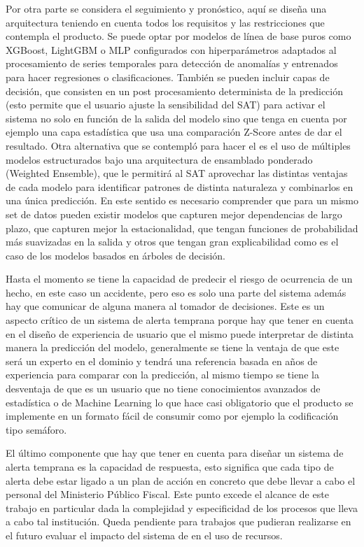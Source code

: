 Por otra parte se considera el seguimiento y pronóstico, aquí se diseña una arquitectura teniendo en cuenta todos los requisitos y las restricciones que contempla el producto. Se puede optar por modelos de línea de base puros como XGBoost, LightGBM o MLP configurados con hiperparámetros adaptados al procesamiento de series temporales para detección de anomalías y entrenados para hacer regresiones o clasificaciones. También se pueden incluir capas de decisión, que consisten en un post procesamiento determinista de la predicción (esto permite que el usuario ajuste la sensibilidad del SAT) para activar el sistema no solo en función de la salida del modelo sino que tenga en cuenta por ejemplo una capa estadística que usa una comparación Z-Score antes de dar el resultado. Otra alternativa que se contempló para hacer el  es el uso de múltiples modelos estructurados bajo una arquitectura de ensamblado ponderado (Weighted Ensemble), que le permitirá al SAT aprovechar las distintas ventajas de cada modelo para identificar patrones de distinta naturaleza y combinarlos en una única predicción. En este sentido es necesario comprender que para un mismo set de datos pueden existir modelos que capturen mejor dependencias de largo plazo, que capturen mejor la estacionalidad, que tengan funciones de probabilidad más suavizadas en la salida y otros que tengan gran explicabilidad como es el caso de los modelos basados en árboles de decisión.

Hasta el momento se tiene la capacidad de predecir el riesgo de ocurrencia de un hecho, en este caso un accidente, pero eso es solo una parte del sistema además hay que comunicar de alguna manera al tomador de decisiones. Este es un aspecto crítico de un sistema de alerta temprana porque hay que tener en cuenta en el diseño de experiencia de usuario que el mismo puede interpretar de distinta manera la predicción del modelo, generalmente se tiene la ventaja de que este será un experto en el dominio y tendrá una referencia basada en años de experiencia para comparar con la predicción, al mismo tiempo se tiene la desventaja de que es un usuario que no tiene conocimientos avanzados de estadística o de Machine Learning lo que hace casi obligatorio que el producto se implemente en un formato fácil de consumir como por ejemplo la codificación tipo semáforo.

El último componente que hay que tener en cuenta para diseñar un sistema de alerta temprana es la capacidad de respuesta, esto significa que cada tipo de alerta debe estar ligado a un plan de acción en concreto que debe llevar a cabo el personal del Ministerio Público Fiscal. Este punto excede el alcance de este trabajo en particular dada la complejidad y especificidad de los procesos que lleva a cabo tal institución. Queda pendiente para trabajos que pudieran realizarse en el futuro evaluar el impacto del sistema de  en el uso de recursos.

